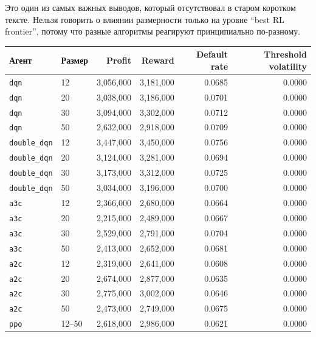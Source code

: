 \documentclass[12pt,a4paper]{article}
\begin{document}
Это один из самых важных выводов, который отсутствовал в старом коротком тексте. Нельзя говорить о влиянии размерности только на уровне ``best RL frontier'', потому что разные алгоритмы реагируют принципиально по-разному.

\begin{table}[H]
    \centering
    \small
    \begin{tabular}{l l r r r r}
        \toprule
        Агент & Размер & Profit & Reward & Default rate & Threshold volatility \\
        \midrule
        \texttt{dqn} & 12 & 3{,}056{,}000 & 3{,}181{,}000 & 0.0685 & 0.0000 \\
        \texttt{dqn} & 20 & 3{,}038{,}000 & 3{,}186{,}000 & 0.0701 & 0.0000 \\
        \texttt{dqn} & 30 & 3{,}094{,}000 & 3{,}302{,}000 & 0.0712 & 0.0000 \\
        \texttt{dqn} & 50 & 2{,}632{,}000 & 2{,}918{,}000 & 0.0709 & 0.0000 \\
        \midrule
        \texttt{double\_dqn} & 12 & 3{,}447{,}000 & 3{,}450{,}000 & 0.0756 & 0.0000 \\
        \texttt{double\_dqn} & 20 & 3{,}124{,}000 & 3{,}281{,}000 & 0.0694 & 0.0000 \\
        \texttt{double\_dqn} & 30 & 3{,}173{,}000 & 3{,}312{,}000 & 0.0725 & 0.0000 \\
        \texttt{double\_dqn} & 50 & 3{,}034{,}000 & 3{,}196{,}000 & 0.0700 & 0.0000 \\
        \midrule
        \texttt{a3c} & 12 & 2{,}366{,}000 & 2{,}680{,}000 & 0.0664 & 0.0000 \\
        \texttt{a3c} & 20 & 2{,}215{,}000 & 2{,}489{,}000 & 0.0667 & 0.0000 \\
        \texttt{a3c} & 30 & 2{,}529{,}000 & 2{,}791{,}000 & 0.0704 & 0.0000 \\
        \texttt{a3c} & 50 & 2{,}413{,}000 & 2{,}652{,}000 & 0.0681 & 0.0000 \\
        \midrule
        \texttt{a2c} & 12 & 2{,}319{,}000 & 2{,}641{,}000 & 0.0608 & 0.0000 \\
        \texttt{a2c} & 20 & 2{,}674{,}000 & 2{,}877{,}000 & 0.0635 & 0.0000 \\
        \texttt{a2c} & 30 & 2{,}775{,}000 & 3{,}002{,}000 & 0.0646 & 0.0000 \\
        \texttt{a2c} & 50 & 2{,}473{,}000 & 2{,}749{,}000 & 0.0675 & 0.0000 \\
        \midrule
        \texttt{ppo} & 12--50 & 2{,}618{,}000 & 2{,}986{,}000 & 0.0621 & 0.0000 \\

\end{tabular}
\end{table}
\end{document}

